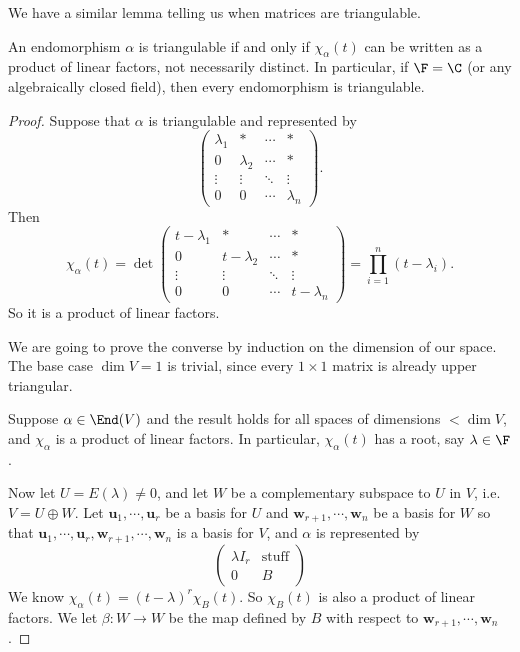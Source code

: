 \documentclass[a4paper]{article}
\begin{document}
We have a similar lemma telling us when matrices are triangulable.

\begin{lemma}
  An endomorphism $\alpha$ is triangulable if and only if $\chi_\alpha(t)$ can be written as a product of linear factors, not necessarily distinct. In particular, if $\F = \C$ (or any algebraically closed field), then every endomorphism is triangulable.
\end{lemma}

\begin{proof}
  Suppose that $\alpha$ is triangulable and represented by
  \[
    \begin{pmatrix}
      \lambda_1 & * & \cdots & *\\
      0 & \lambda_2 & \cdots & *\\
      \vdots & \vdots & \ddots & \vdots\\
      0 & 0 & \cdots & \lambda_n
    \end{pmatrix}.
  \]
  Then
  \[
    \chi_\alpha(t) = \det
    \begin{pmatrix}
      t - \lambda_1 & * & \cdots & *\\
      0 & t - \lambda_2 & \cdots & *\\
      \vdots & \vdots & \ddots & \vdots\\
      0 & 0 & \cdots & t - \lambda_n
    \end{pmatrix} =
    \prod_{i = 1}^n (t - \lambda_i).
  \]
  So it is a product of linear factors.

  We are going to prove the converse by induction on the dimension of our space. The base case $\dim V = 1$ is trivial, since every $1\times 1$ matrix is already upper triangular.

  Suppose $\alpha \in \End(V)$ and the result holds for all spaces of dimensions $< \dim V$, and $\chi_\alpha$ is a product of linear factors. In particular, $\chi_\alpha(t)$ has a root, say $\lambda \in \F$.

  Now let $U = E(\lambda) \not= 0$, and let $W$ be a complementary subspace to $U$ in $V$, i.e.\ $V = U \oplus W$. Let $\mathbf{u}_1, \cdots, \mathbf{u}_r$ be a basis for $U$ and $\mathbf{w}_{r + 1}, \cdots, \mathbf{w}_n$ be a basis for $W$ so that $\mathbf{u}_1, \cdots, \mathbf{u}_{r}, \mathbf{w}_{r + 1}, \cdots, \mathbf{w}_n$ is a basis for $V$, and $\alpha$ is represented by
  \[
    \begin{pmatrix}
      \lambda I_r & \text{stuff}\\
      0 & B
    \end{pmatrix}
  \]
  We know $\chi_\alpha(t) = (t - \lambda)^r \chi_B(t)$. So $\chi_B(t)$ is also a product of linear factors. We let $\beta: W\to W$ be the map defined by $B$ with respect to $\mathbf{w}_{r + 1}, \cdots, \mathbf{w}_n$.


\end{proof}
\end{document}
